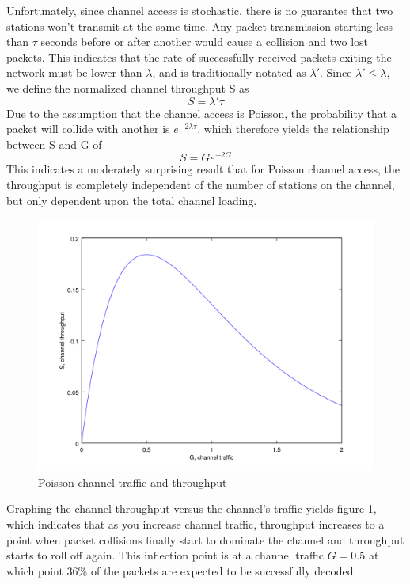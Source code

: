 Unfortunately, since channel access is stochastic, 
there is no guarantee that two stations won't transmit at the same time.
Any packet transmission starting less than $\tau$ seconds before or after another would
cause a collision and two lost packets. 
This indicates that the rate of successfully received packets exiting the network must
be lower than $\lambda$, and is traditionally notated as $\lambda'$. 
Since $\lambda' \leq \lambda$, we define the normalized channel throughput S as
\begin{equation}
	S = \lambda' \tau
\end{equation}
Due to the assumption that the channel access is Poisson, 
the probability that a packet will collide with another is $e^{-2 \lambda \tau}$,
which therefore yields the relationship between S and G of
\begin{equation}
	S = G e ^ {-2 G}
\end{equation}
This indicates a moderately surprising result that for Poisson channel access,
the throughput is completely independent of the number of stations on the channel,
but only dependent upon the total channel loading.

\begin{figure}
	\centering
	\includegraphics[width=1.0\textwidth]{src/octave/poissonthroughput}
	\caption{Poisson channel traffic and throughput}
	\label{fig:SGpoisson}
\end{figure}
Graphing the channel throughput versus the channel's traffic yields figure 
\ref{fig:SGpoisson}, which indicates that as you increase channel traffic, 
throughput increases to a point when packet collisions finally start to dominate
the channel and throughput starts to roll off again. This inflection point is at
a channel traffic $G = 0.5$ at which point 36\% of the packets are expected
to be successfully decoded.

